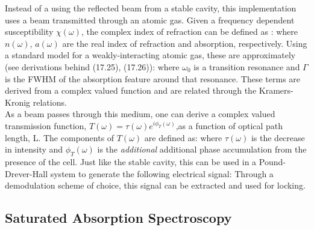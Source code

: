 Instead of a using the reflected beam from a stable cavity, this implementation uses a beam transmitted through an atomic gas. Given a frequency dependent susceptibility $\chi(\omega)$, the complex index of refraction can be defined as \cite{steckoptics}:
where $n(\omega)$, $a(\omega)$ are the real index of refraction and absorption, respectively. Using a standard model for a weakly-interacting atomic gas, these are approximately \cite{steckoptics} (see derivations behind (17.25), (17.26)):
where $\omega_0$ is a transition resonance and $\Gamma$ is the FWHM of the absorption feature around that resonance. These terms are derived from a complex valued function and are related through the Kramers-Kronig relations.\\

As a beam passes through this medium, one can derive a complex valued transmission function, $T(\omega)=\tau(\omega)e^{i\phi_T(\omega)}$,as a function of optical path length, L. The components of $T(\omega)$ are defined as:
where $\tau(\omega)$ is the decrease in intensity and $\phi_T(\omega)$ is the \emph{additional} additional phase accumulation from the presence of the cell. Just like the stable cavity, this can be used in a Pound-Drever-Hall system to generate the following electrical signal:
Through a demodulation scheme of choice, this signal can be extracted and used for locking.


\subsection{Saturated Absorption Spectroscopy}
\label{sec:sat_abs}

